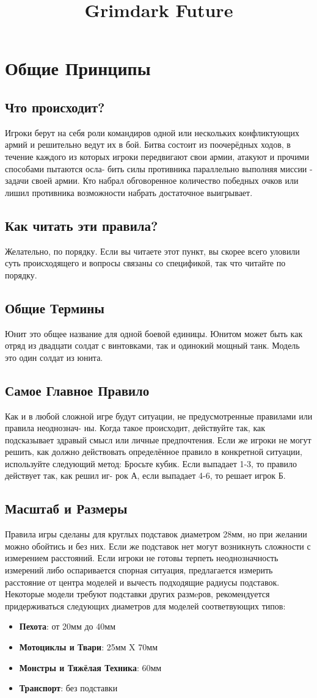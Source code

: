 \documentclass[twocolumn]{article}
\title{Grimdark Future}
\newcommand{\h}[1]{\textbf{#1}}
\newcommand{\ssec}[1]{\section{#1}\label{sec:#1}}
\newcommand{\subsec}[1]{\subsection{#1}\label{subsec:#1}}
\begin{document}
\maketitle
\tableofcontents

\newpage

\ssec{Общие Принципы}
\subsec{Что происходит?}
Игроки берут на себя роли командиров одной или нескольких конфликтующих армий и решительно ведут их в бой. Битва состоит из поочерёдных ходов, в течение каждого из которых игроки передвигают свои армии, атакуют и прочими способами пытаются осла- бить силы противника параллельно выполняя миссии - задачи своей армии. Кто набрал обговоренное количество победных очков или лишил противника возможности набрать достаточное выигрывает.

\subsec{Как читать эти правила?}
Желательно, по порядку. Если вы читаете этот пункт, вы скорее всего уловили суть происходящего и вопросы связаны со спецификой, так что читайте по порядку.

\subsec{Общие Термины}
Юнит это общее название для одной боевой единицы. Юнитом может быть как отряд из двадцати солдат с винтовками, так и одинокий мощный танк. Модель это один солдат из юнита.

\subsec{Самое Главное Правило}
Как и в любой сложной игре будут ситуации, не предусмотренные правилами или правила неоднознач- ны. Когда такое происходит, действуйте так, как подсказывает здравый смысл или личные предпочтения. Если же игроки не могут решить, как должно действовать определённое правило в конкретной ситуации, используйте следующий метод: Бросьте кубик. Если выпадает 1-3, то правило действует так, как решил иг- рок А, если выпадает 4-6, то решает игрок Б.

\subsec{Масштаб и Размеры}
Правила игры сделаны для круглых подставок диаметром 28мм, но при желании можно обойтись и без них. Если же подставок нет могут возникнуть сложности с измерением расстояний. Если игроки не готовы терпеть неоднозначность измерений либо оспаривается спорная ситуация, предлагается измерить расстояние от центра моделей и вычесть подходящие радиусы подставок. Некоторые модели требуют подставки других размeров, рекомендуется придерживаться следующих диаметров для моделей соответвующих типов:

\begin{itemize}
    \item \h{Пехота}: от 20мм до 40мм
    \item \h{Мотоциклы и Твари}: 25мм X 70мм
    \item \h{Монстры и Тяжёлая Техника}: 60мм
    \item \h{Транспорт}: без подставки
\end{itemize}
\end{document}
